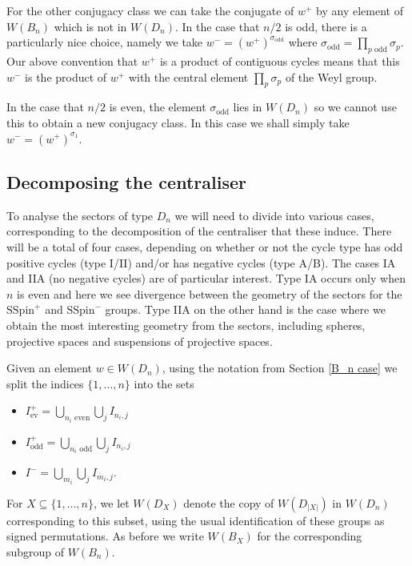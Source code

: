 \documentclass[11pt,a4paper]{article}
\def\SSpin{\mathrm{SSpin}}
\def\SSpin{\mathrm{SSpin}}
\def\mbar{\overline{m}}
\def\mbar{\overline{m}}
\def\ev{\mathrm{ev}}
\def\odd{\mathrm{odd}}
\def\wplus{w^+}
\def\wminus{w^-}
\begin{document}
For the other conjugacy class we can take the conjugate of $\wplus$ by any element of $W(B_n)$ which is not in $W(D_n)$. In the case that $n/2$ is odd, there is a particularly nice choice, namely we take $\wminus=(\wplus)^{\sigma_{\odd}}$ where $\sigma_{\odd}=\prod_{p\text{ odd}}\sigma_p$. Our above convention that $\wplus$ is a product of contiguous cycles means that this $\wminus$ is the product of $\wplus$ with the central element $\prod_p\sigma_p$ of the Weyl group.

In the case that $n/2$ is even, the element $\sigma_\odd$ lies in $W(D_n)$ so we cannot use this to obtain a new conjugacy class.  In this case we shall simply take $\wminus=(\wplus)^{\sigma_1}$.





\subsection{Decomposing the centraliser}
\label{centraliser structure}
To analyse the sectors of type $D_n$ we will need to divide into various cases, corresponding to the decomposition of the centraliser that these induce.  There will be a total of four cases, depending on whether or not the cycle type has odd positive cycles (type I/II) and/or has negative cycles (type A/B). The cases IA and IIA (no negative cycles) are of particular interest.  Type IA occurs only when $n$ is even and here we see divergence between the geometry of the sectors for the $\SSpin^+$ and $\SSpin^-$ groups. Type IIA on the other hand is the case where we obtain the most interesting geometry from the sectors, including spheres, projective spaces and suspensions of projective spaces.



Given an element $w\in W(D_n)$, using the notation from Section \ref{B_n case} we split the indices $\{1,\dots,n\}$ into the sets
\begin{itemize}
    \item $I^+_{\ev}=\bigcup\limits_{n_i \text{ even}}\bigcup\limits_j I_{n_i,j}$
    
    \item $I^+_{\odd}=\bigcup\limits_{n_i \text{ odd}}\bigcup\limits_jI_{n_i,j}$

    \item $I^-=\bigcup\limits_{m_i}\bigcup\limits_j I_{\mbar_i,j}$.
\end{itemize}

For $X\subseteq \{1,\dots, n\}$, we let $W(D_X)$ denote the copy of $W(D_{|X|})$ in $W(D_n)$ corresponding to this subset, using the usual identification of these groups as signed permutations. As before we write $W(B_X)$ for the corresponding subgroup of $W(B_n)$.
\end{document}

